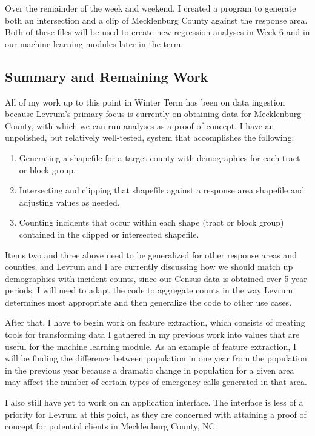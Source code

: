\documentclass[onecolumn, draftclsnofoot,10pt, compsoc]{IEEEtran}
\begin{document}
\begin{singlespace}
Over the remainder of the week and weekend, I created a program to generate both an intersection and a clip of Mecklenburg County against the response area. Both of these files will be used to create new regression analyses in Week 6 and in our machine learning modules later in the term.

\subsection{Summary and Remaining Work}
All of my work up to this point in Winter Term has been on data ingestion because Levrum's primary focus is currently on obtaining data for Mecklenburg County, with which we can run analyses as a proof of concept. I have an unpolished, but relatively well-tested, system that accomplishes the following:

\begin{enumerate}
    \item Generating a shapefile for a target county with demographics for each tract or block group.
    \item Intersecting and clipping that shapefile against a response area shapefile and adjusting values as needed.
    \item Counting incidents that occur within each shape (tract or block group) contained in the clipped or intersected shapefile.
\end{enumerate}

Items two and three above need to be generalized for other response areas and counties, and Levrum and I are currently discussing how we should match up demographics with incident counts, since our Census data is obtained over 5-year periods. I will need to adapt the code to aggregate counts in the way Levrum determines most appropriate and then generalize the code to other use cases.

After that, I have to begin work on feature extraction, which consists of creating tools for transforming data I gathered in my previous work into values that are useful for the machine learning module. As an example of feature extraction, I will be finding the difference between population in one year from the population in the previous year because a dramatic change in population for a given area may affect the number of certain types of emergency calls generated in that area.

I also still have yet to work on an application interface. The interface is less of a priority for Levrum at this point, as they are concerned with attaining a proof of concept for potential clients in Mecklenburg County, NC.

\end{singlespace}
\end{document}
